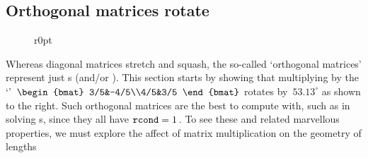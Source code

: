\subsection{Orthogonal matrices rotate}
\label{sec:omr}


\begin{wrapfigure}r{0pt}  \end{wrapfigure}
Whereas diagonal matrices stretch and squash, the so-called 
`orthogonal matrices' represent just s (and/or ).
This section starts by showing that multiplying by the `'~\(\begin{bmat} 3/5&-4/5\\4/5&3/5 \end{bmat}\) rotates by~\(53.13^\circ\) as shown to the right.
Such orthogonal matrices are the best to compute with, such as in solving s, since they all have \(\verb|rcond|=1\)\,.
To see these and related marvellous properties, we must explore the affect of matrix multiplication on the geometry of lengths 



